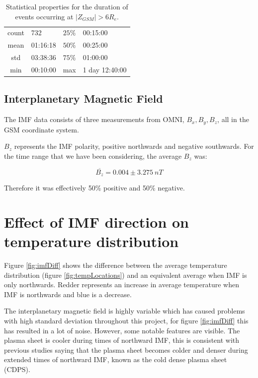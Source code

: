 \documentclass[12pt]{article}
\begin{document}
\begin{table}[]
    \begin{minipage}[c]{0.57\textwidth}
        \centering
        \begin{tabular}{||c|l||c|l||}
            \hline
            count & 732 & $25\%$ & 00:15:00 \\
            mean & 01:16:18 & $50\%$ & 00:25:00 \\
            std & 03:38:36 & $75\%$ & 01:00:00 \\
            min & 00:10:00 & max & 1 day 12:40:00 \\
            \hline
        \end{tabular}
    \end{minipage}\hfill
    \begin{minipage}[c]{0.4\textwidth}
        \caption{Statistical properties for the duration of events occurring at $|Z_{GSM}|>6R_e$.}
        \label{tab:event_durn}
    \end{minipage}
\end{table}

\subsection{Interplanetary Magnetic Field \label{interMF}}
The IMF data consists of three measurements from OMNI, $B_x, B_y, B_z$, all in the GSM coordinate system.

$B_z$ represents the IMF polarity, positive northwards and negative southwards. For the time range that we have been considering, the average $B_z$ was:

\begin{equation}
    \overline{B_z} = 0.004 \pm 3.275\ nT
\end{equation}

Therefore it was effectively 50\% positive and 50\% negative. 

\section{Effect of IMF direction on temperature distribution}
Figure \ref{fig:imfDiff} shows the difference between the average temperature distribution (figure \ref{fig:tempLocations}) and an equivalent average when IMF is only northwards. Redder represents an increase in average temperature when IMF is northwards and blue is a decrease.

The interplanetary magnetic field is highly variable which has caused problems with high standard deviation throughout this project, for figure \ref{fig:imfDiff} this has resulted in a lot of noise. However, some notable features are visible. The plasma sheet is cooler during times of northward IMF, this is consistent with previous studies \cite{TAYLOR20081619} saying that the plasma sheet becomes colder and denser during extended times of northward IMF, known as the cold dense plasma sheet (CDPS).
\end{document}
